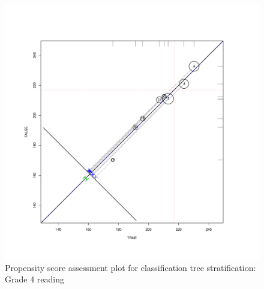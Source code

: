 \clearpage
\begin{figure}
\begin{center}
\includegraphics[height=.4\textheight,width=.4\textheight]{../Figures2009/g4read-circpsa-tree.pdf}
\caption{Propensity score assessment plot for classification tree stratification: Grade 4 reading}
\end{center}
\end{figure}



